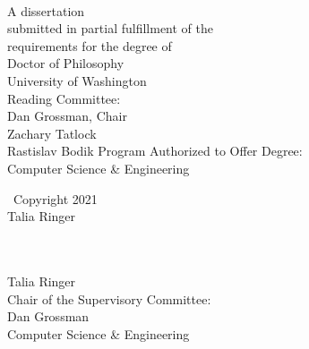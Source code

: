 \documentclass[ twoside,openright,titlepage,numbers=noenddot,headinclude,
                footinclude=true,cleardoublepage=empty,abstractoff,%
                BCOR=5mm,paper=letter,fontsize=11pt,letterpaper,%
                american,%
                ]{scrreprt}
\begin{document}
%
%
\begin{titlepage}
	\begin{addmargin}[-1cm]{-3cm}
    \begin{center}
        \large
        \hfill
        \vfill
        \begingroup
            \color{thecolor} \\ \bigskip
        \endgroup
        \vfill
        A dissertation \\
        submitted in partial fulfillment of the \\
        requirements for the degree of \\
        \medskip
        Doctor of Philosophy \\
        \bigskip
        University of Washington \\
        \vfill
        Reading Committee: \\
        \smallskip
        Dan Grossman, Chair \\
        \smallskip
        Zachary Tatlock \\
        \smallskip
        Rastislav Bodik
        \vfill
        Program Authorized to Offer Degree: \\
        \smallskip
        Computer Science \& Engineering
    \end{center}
  \end{addmargin}
\end{titlepage}


\cleardoublepage
\thispagestyle{empty}
\begin{center}
    \vspace*{20ex}
    \textcopyright\ Copyright 2021 \\
    \bigskip
    Talia Ringer
\end{center}
 
%
%

%
%
\cleardoublepage
\thispagestyle{empty}

\begin{center}
     \\
    \bigskip
    {\color{thecolor}
     \\
    }
    \bigskip
    Talia Ringer \\
    \bigskip
    Chair of the Supervisory Committee: \\
    Dan Grossman \\
    Computer Science \& Engineering \\
    \bigskip
\end{center}
\end{document}
